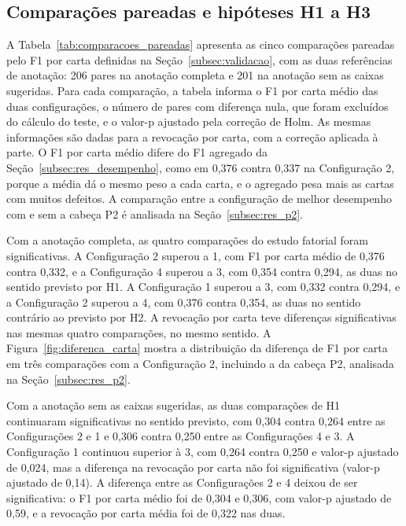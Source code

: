 \documentclass[
    12pt,                %
    openright,           %
    oneside,             %
    a4paper,             %
    english,             %
    brazil               %
]{abntex2}
\begin{document}
\subsection{Comparações pareadas e hipóteses H1 a H3}
\label{subsec:res_hipoteses}

A Tabela~\ref{tab:comparacoes_pareadas} apresenta as cinco comparações
pareadas pelo F1 por carta definidas na Seção~\ref{subsec:validacao}, com
as duas referências de anotação: 206 pares na anotação completa e 201 na
anotação sem as caixas sugeridas. Para cada comparação, a tabela informa o
F1 por carta médio das duas configurações, o número de pares com diferença
nula, que foram excluídos do cálculo do teste, e o valor-p ajustado pela
correção de Holm. As mesmas informações são dadas para a revocação por
carta, com a correção aplicada à parte. O F1 por carta médio difere do F1 agregado da Seção~\ref{subsec:res_desempenho}, como em 0,376 contra 0,337 na Configuração 2, porque a média dá o mesmo peso a cada carta, e o agregado pesa mais as cartas com muitos defeitos. A comparação entre a configuração
de melhor desempenho com e sem a cabeça P2 é analisada na
Seção~\ref{subsec:res_p2}.

Com a anotação completa, as quatro comparações do estudo fatorial foram
significativas. A Configuração 2 superou a 1, com F1 por carta médio de
0,376 contra 0,332, e a Configuração 4 superou a 3, com 0,354 contra 0,294,
as duas no sentido previsto por H1. A Configuração 1 superou a 3, com 0,332
contra 0,294, e a Configuração 2 superou a 4, com 0,376 contra 0,354, as
duas no sentido contrário ao previsto por H2. A revocação por carta teve
diferenças significativas nas mesmas quatro comparações, no mesmo
sentido. A Figura~\ref{fig:diferenca_carta} mostra a distribuição da diferença de F1 por carta em três comparações com a Configuração 2, incluindo a da cabeça P2, analisada na Seção~\ref{subsec:res_p2}.

Com a anotação sem as caixas sugeridas, as duas comparações de H1
continuaram significativas no sentido previsto, com 0,304 contra 0,264
entre as Configurações 2 e 1 e 0,306 contra 0,250 entre as Configurações 4
e 3. A Configuração 1 continuou superior à 3, com 0,264 contra 0,250 e
valor-p ajustado de 0,024, mas a diferença na revocação por carta não foi
significativa (valor-p ajustado de 0,14). A diferença entre as
Configurações 2 e 4 deixou de ser significativa: o F1 por carta médio foi
de 0,304 e 0,306, com valor-p ajustado de 0,59, e a revocação por carta
média foi de 0,322 nas duas.
\end{document}
